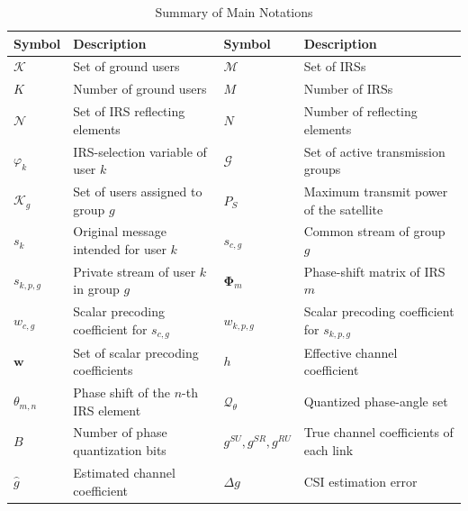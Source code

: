 \documentclass[12pt,onecolumn]{IEEEtran}
\newif\iffull
\begin{document}
\iffull
\begin{table}[t]
\centering
\caption{Summary of Main Notations}
\label{tab:variables}
\renewcommand{\arraystretch}{1.18}
\small
\singlespacing
\begin{tabularx}{\textwidth}{
>{\centering\arraybackslash}p{1.6cm}
>{\raggedright\arraybackslash}X
>{\centering\arraybackslash}p{1.6cm}
>{\raggedright\arraybackslash}X
}
\toprule
\textbf{Symbol} & \textbf{Description} 
& \textbf{Symbol} & \textbf{Description} \\
\midrule

$\mathcal{K}$ 
& Set of ground users
& $\mathcal{M}$ 
& Set of IRSs \\

$K$ 
& Number of ground users
& $M$ 
& Number of IRSs \\

$\mathcal{N}$ 
& Set of IRS reflecting elements
& $N$ 
& Number of reflecting elements \\

$\varphi_k$ 
& IRS-selection variable of user $k$
& $\mathcal{G}$ 
& Set of active transmission groups \\

$\mathcal{K}_g$ 
& Set of users assigned to group $g$
& $P_S$ 
& Maximum transmit power of the satellite \\

$s_k$ 
& Original message intended for user $k$
& $s_{c,g}$ 
& Common stream of group $g$ \\

$s_{k,p,g}$
& Private stream of user $k$ in group $g$
& $\boldsymbol{\Phi}_m$
& Phase-shift matrix of IRS $m$ \\

$w_{c,g}$
& Scalar precoding coefficient for $s_{c,g}$
& $w_{k,p,g}$
& Scalar precoding coefficient for $s_{k,p,g}$ \\

$\mathbf{w}$ 
& Set of scalar precoding coefficients
& $h$ 
& Effective channel coefficient \\

$\theta_{m,n}$ 
& Phase shift of the $n$-th IRS element
& $\mathcal{Q}_{\theta}$ 
& Quantized phase-angle set \\

$B$ 
& Number of phase quantization bits
& $g^{SU}\!,g^{SR}\!,g^{RU}$ 
& True channel coefficients of each link \\

$\hat{g}$ 
& Estimated channel coefficient
& $\Delta g$ 
& CSI estimation error \\


\end{tabularx}
\end{table}
\end{document}
